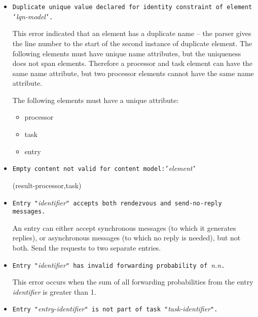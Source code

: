 \begin{itemize}
\item \texttt{Duplicate unique value declared for identity constraint
    of element '}\emph{lqn-model}\texttt{'.}
  
  This error indicated that an element has a duplicate
  name
  -- the parser gives the line number to the start of the second
  instance of duplicate element.  The following elements must have
  unique name attributes, but the
  uniqueness does not span elements.  Therefore a processor and task
  element can have the same name attribute, but two processor elements
  cannot have the same name attribute.
  
  The following elements must have a unique 
  attribute:
  \begin{itemize}
  \item processor
  \item task
  \item entry
  \end{itemize}


\item \texttt{Empty content not valid for content
    model:'}\emph{element}\texttt{'}

(result-processor,task)

\item \texttt{Entry "}\emph{identifier}\texttt{" accepts both
    rendezvous and send-no-reply messages.}

  An entry can either accept synchronous messages (to which it
  generates replies), or asynchronous messages (to which no reply is
  needed), but not both.  Send the requests to two separate
  entries.

\item \texttt{Entry "}\emph{identifier}\texttt{" has invalid
    forwarding probability of }\emph{n.n}\texttt{.}
  
  This error occurs when the sum of all forwarding
  probabilities from the entry
  \emph{identifier} is greater than 1.

\item \texttt{Entry "}\emph{entry-identifier}\texttt{"  is not part of task
    "}\emph{task-identifier}\texttt{".}
  

\end{itemize}
